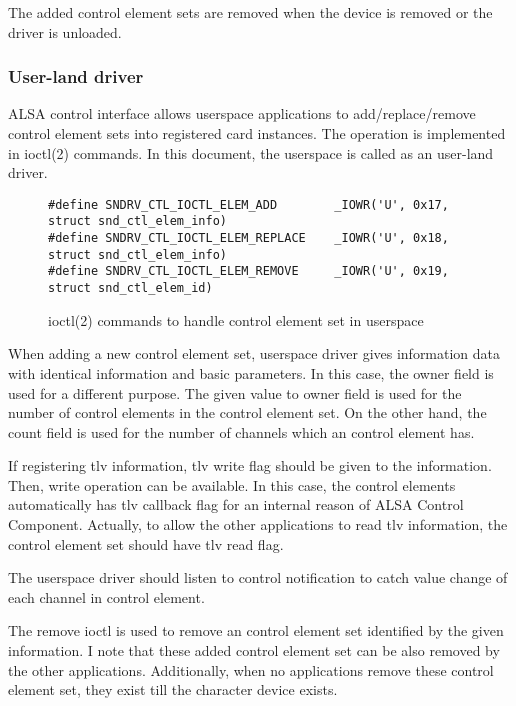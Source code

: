 \documentclass[onecolumn]{article}
\begin{document}
The added control element sets are removed when the device is removed or the driver is unloaded.


\subsubsection{User-land driver}

ALSA control interface allows userspace applications to add/replace/remove control element sets into registered card instances. The operation is implemented in ioctl(2) commands. In this document, the userspace is called as an user-land driver.

\begin{figure}[htbp]
\small
\begin{verbatim}
#define SNDRV_CTL_IOCTL_ELEM_ADD        _IOWR('U', 0x17, struct snd_ctl_elem_info)
#define SNDRV_CTL_IOCTL_ELEM_REPLACE    _IOWR('U', 0x18, struct snd_ctl_elem_info)
#define SNDRV_CTL_IOCTL_ELEM_REMOVE     _IOWR('U', 0x19, struct snd_ctl_elem_id)
\end{verbatim}
\caption{{ioctl(2) commands to handle control element set in userspace}}
\label{ioctl-commands-userspace-element}
\end{figure}

When adding a new control element set, userspace driver gives information data with identical information and basic parameters. In this case, the owner field is used for a different purpose. The given value to owner field is used for the number of control elements in the control element set. On the other hand, the count field is used for the number of channels which an control element has.

If registering tlv information, tlv write flag should be given to the information. Then, write operation can be available. In this case, the control elements automatically has tlv callback flag for an internal reason of ALSA Control Component. Actually, to allow the other applications to read tlv information, the control element set should have tlv read flag.

The userspace driver should listen to control notification to catch value change of each channel in control element.

The remove ioctl is used to remove an control element set identified by the given information. I note that these added control element set can be also removed by the other applications. Additionally, when no applications remove these control element set, they exist till the character device exists.
\end{document}
